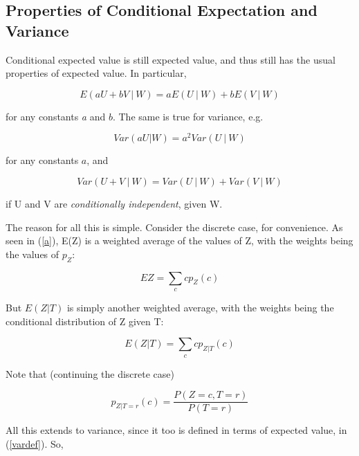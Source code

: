\documentclass[11pt]{article}
\begin{document}

\subsection{Properties of Conditional Expectation and Variance}

Conditional expected value is still expected value, and thus still has
the usual properties of expected value.  In particular,

\begin{equation}
E(aU + bV ~|~ W) = a E(U ~|~ W) + b E(V ~|~ W)
\end{equation}

for any constants {\it a} and $b$.  The same is true for variance, e.g.

\begin{equation}
Var(aU | W) = a^2 Var(U ~|~ W)
\end{equation}

for any constants $a$, and 

\begin{equation}
Var(U + V ~|~ W) = Var(U ~|~ W) + Var(V ~|~ W)
\end{equation}

if U and V are {\it conditionally independent}, given W.

The reason for all this is simple.  Consider the discrete case, for
convenience.  As seen in (\ref{a}), E(Z) is a weighted average of the
values of Z, with the weights being the values of $p_Z$:

\begin{equation}
EZ = \sum_c c p_Z(c)
\end{equation}

But $E(Z | T)$ is simply another weighted average, with the weights
being the conditional distribution of Z given T:

\begin{equation}
E(Z | T) = \sum_c c p_{Z|T}(c)
\end{equation}

Note that (continuing the discrete case)

\begin{equation}
p_{Z|T=r}(c) =
\frac{P(Z = c, T = r)}{P(T = r)}
\end{equation}

All this extends to variance, since it too is defined in terms of
expected value, in (\ref{vardef}).  So,
\end{document}
